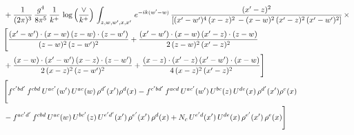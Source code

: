 \documentclass[9pt]{article}
\numberwithin{equation}{section}
\begin{document}
\begin{align}
&  + \frac{1}{(2\pi)^{3}}\, \frac{g^{4}}{8\pi^{5}}\,\frac{1}{k^{+}}\,\log{\left(\frac{\vee}{k^{+}}\right)}\,\int_{z,w,w^{\prime},x,x'}\, e^{-ik(w^{\prime}-w)}\, \frac{(x'-z)^{2}}{\left[(x'-w')^{4}\,(x-z)^{2}\, - (x-w)^{2}\, (x'-z)^{2}\,(x'-w')^{2}\right]}\,  \times\notag \\ & \Bigg[\frac{(x'-w')\cdot (x-w)\, (z-w)\cdot (z-w')}{(z-w)^{2}\, (z-w')^{2}}+\frac{(x'-w')\cdot (x-w)\, (x'-z)\cdot (z-w)}{2\, (z-w)^{2}\, (x'-z)^{2}}\notag \\ & +\frac{(x-w)\cdot (x'-w')\, (x-z)\cdot (z-w')}{2\, (x-z)^{2}\, (z-w')^{2}}+\frac{(x-z)\cdot (x'-z)\, (x'-w')\cdot (x-w)}{4\, (x-z)^{2}\, (x'-z)^{2}}\Bigg] \notag \\ & \Bigg[f^{c'bd'}\,f^{cbd}\, U^{ac'}(w')\,U^{ac}(w)\,\rho^{d'}(x')\rho^{d}(x)- f^{c'bd'}\,f^{acd}\,U^{ac'}(w')\,U^{bc}(z)\,U^{de}(x)\,\rho^{d'}(x')\rho^{e}(x) \notag \\ & -f^{ac'd'}\,f^{cbd}\,U^{ac}(w)\,U^{bc'}(z)\,U^{e'd'}(x')\,\rho^{e'}(x')\,\rho^{d}(x) +N_{c}\,U^{e'd}(x')\,U^{de}(x)\,\rho^{e'}(x')\,\rho^{e}(x)\Bigg]
\end{align}
\end{document}
